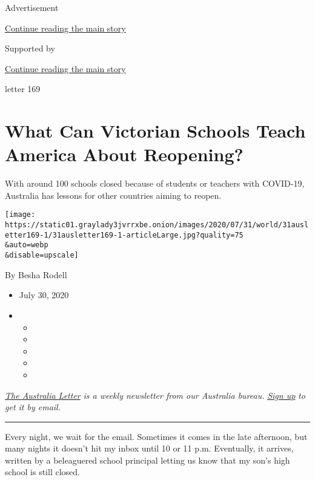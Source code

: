 Advertisement

\protect\hyperlink{after-top}{Continue reading the main story}

Supported by

\protect\hyperlink{after-sponsor}{Continue reading the main story}

letter 169

\hypertarget{what-can-victorian-schools-teach-america-about-reopening}{%
\section{What Can Victorian Schools Teach America About
Reopening?}\label{what-can-victorian-schools-teach-america-about-reopening}}

With around 100 schools closed because of students or teachers with
COVID-19, Australia has lessons for other countries aiming to reopen.

\texttt{[image: https://static01.graylady3jvrrxbe.onion/images/2020/07/31/world/31ausletter169-1/31ausletter169-1-articleLarge.jpg?quality=75\\\&auto=webp\\\&disable=upscale]}

By Besha Rodell

\begin{itemize}
\item
  July 30, 2020
\item
  \begin{itemize}
  \item
  \item
  \item
  \item
  \item
  \end{itemize}
\end{itemize}

\href{https://www.nytimes3xbfgragh.onion/series/nyt-australia-newsletter?module=inline}{\emph{The
Australia Letter}} \emph{is a weekly newsletter from our Australia
bureau.}
\href{https://www.nytimes3xbfgragh.onion/newsletters/australia-letter?module=inline}{\emph{Sign
up}} \emph{to get it by email.}

\begin{center}\rule{0.5\linewidth}{\linethickness}\end{center}

Every night, we wait for the email. Sometimes it comes in the late
afternoon, but many nights it doesn't hit my inbox until 10 or 11 p.m.
Eventually, it arrives, written by a beleaguered school principal
letting us know that my son's high school is still closed.

